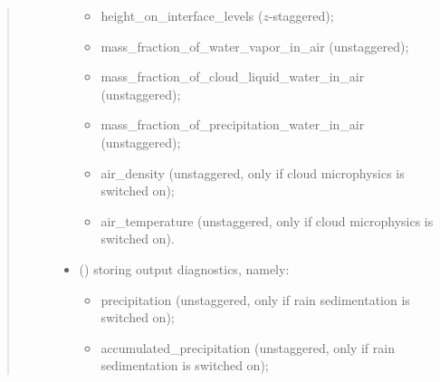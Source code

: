 \documentclass[letterpaper,10pt,english]{sphinxmanual}
\begin{document}
\begin{fulllineitems}
\begin{fulllineitems}
\begin{quote}
\begin{description}
\begin{itemize}
\begin{itemize}
\item {} 
height\_on\_interface\_levels (\(z\)-staggered);

\item {} 
mass\_fraction\_of\_water\_vapor\_in\_air (unstaggered);

\item {} 
mass\_fraction\_of\_cloud\_liquid\_water\_in\_air (unstaggered);

\item {} 
mass\_fraction\_of\_precipitation\_water\_in\_air (unstaggered);

\item {} 
air\_density (unstaggered, only if cloud microphysics is switched on);

\item {} 
air\_temperature (unstaggered, only if cloud microphysics is switched on).

\end{itemize}

\item {} 
 () \textendash{}  storing output diagnostics, namely:
\begin{itemize}
\item {} 
precipitation (unstaggered, only if rain sedimentation is switched on);

\item {} 
accumulated\_precipitation (unstaggered, only if rain sedimentation is switched on);

\end{itemize}

\end{itemize}


\end{description}\end{quote}

\end{fulllineitems}



\end{fulllineitems}
\end{document}
